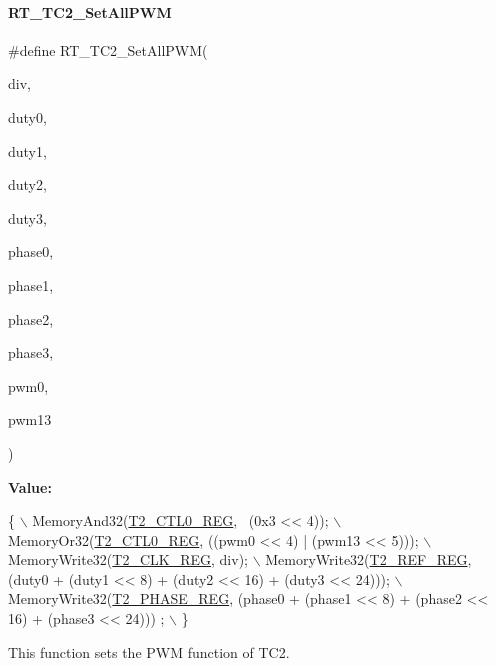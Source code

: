 \paragraph{\texorpdfstring{R\+T\+\_\+\+T\+C2\+\_\+\+Set\+All\+P\+WM}{RT\_TC2\_SetAllPWM}}
{\footnotesize\ttfamily \#define R\+T\+\_\+\+T\+C2\+\_\+\+Set\+All\+P\+WM(\begin{DoxyParamCaption}\item[{}]{div,  }\item[{}]{duty0,  }\item[{}]{duty1,  }\item[{}]{duty2,  }\item[{}]{duty3,  }\item[{}]{phase0,  }\item[{}]{phase1,  }\item[{}]{phase2,  }\item[{}]{phase3,  }\item[{}]{pwm0,  }\item[{}]{pwm13 }\end{DoxyParamCaption})}

{\bfseries Value\+:}
\begin{DoxyCode}
\{                                                                                               \(\backslash\)
        MemoryAnd32(\mbox{\hyperlink{a00026_a5853553391e986211306d4f29ab31e47}{T2\_CTL0\_REG}}, ~(0x3 << 4));                                                  
          \(\backslash\)
        MemoryOr32(\mbox{\hyperlink{a00026_a5853553391e986211306d4f29ab31e47}{T2\_CTL0\_REG}}, ((pwm0 << 4) | (pwm13 << 5)));                                  
          \(\backslash\)
        MemoryWrite32(\mbox{\hyperlink{a00026_adaf93e89c438f05ea402aee531c0ac3b}{T2\_CLK\_REG}}, div);                                                          
         \(\backslash\)
        MemoryWrite32(\mbox{\hyperlink{a00026_afc6a4a26e5276c1e4fe1b3fe26e70984}{T2\_REF\_REG}}, (duty0 + (duty1 << 8) + (duty2 << 16) + (duty3 << 24)));       
         \(\backslash\)
        MemoryWrite32(\mbox{\hyperlink{a00026_a186d446896bf8b88b2ee0da5b726c680}{T2\_PHASE\_REG}}, (phase0 + (phase1 << 8) + (phase2 << 16) + (phase3 << 24)))
      ;    \(\backslash\)
    \}
\end{DoxyCode}


This function sets the P\+WM function of T\+C2. 


